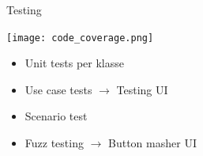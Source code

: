 \documentclass[mathserif,serif]{beamer}
\begin{document}
  \begin{frame}{Testing}
      \begin{center}
      \texttt{[image: code\_coverage.png]}
        \begin{itemize}
        \item Unit tests per klasse
        \item Use case tests $\rightarrow$ Testing UI
        \item Scenario test
        \item Fuzz testing $\rightarrow$ Button masher UI
        \end{itemize}
      \end{center}
  \end{frame}

\end{document}
